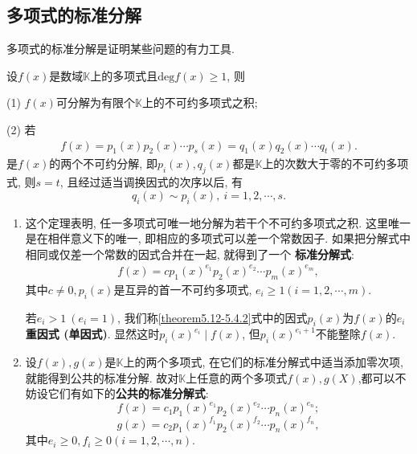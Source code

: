 \documentclass[../../main.tex]{subfiles}%
\begin{document}
\subsection{多项式的标准分解}

多项式的标准分解是证明某些问题的有力工具.

\begin{theorem}[因式分解定理]\label{theorem:因式分解定理}
设\(f(x)\)是数域\(\mathbb{K}\)上的多项式且\(\mathrm{deg }f(x)\geqslant  1\), 则

(1) \(f(x)\)可分解为有限个\(\mathbb{K}\)上的不可约多项式之积;

(2) 若
\begin{align}
f(x)=p_1(x)p_2(x)\cdots p_s(x)=q_1(x)q_2(x)\cdots q_t(x).\label{theorem5.12-5.4.1}
\end{align}
是\(f(x)\)的两个不可约分解, 即\(p_i(x),q_j(x)\)都是\(\mathbb{K}\)上的次数大于零的不可约多项式, 则\(s = t\), 且经过适当调换因式的次序以后, 有
\[
q_i(x)\sim p_i(x),\ i = 1,2,\cdots,s.
\]
\end{theorem}
\begin{note}
\begin{enumerate}
\item 这个定理表明, 任一多项式可唯一地分解为若干个不可约多项式之积. 这里唯一是在相伴意义下的唯一, 即相应的多项式可以差一个常数因子. 如果把分解式中相同或仅差一个常数的因式合并在一起, 就得到了一个 \textbf{标准分解式}:
\begin{align}
f(x)=cp_1(x)^{e_1}p_2(x)^{e_2}\cdots p_m(x)^{e_m}, \label{theorem5.12-5.4.2}
\end{align}
其中\(c\neq 0, p_i(x)\)是互异的首一不可约多项式, \(e_i\geqslant  1(i = 1,2,\cdots,m)\).

若\(e_i>1\ (e_i = 1)\), 我们称\eqref{theorem5.12-5.4.2}式中的因式\(p_i(x)\)为\(f(x)\)的\textbf{\(e_i\)重因式 (单因式)}. 显然这时\(p_i(x)^{e_i}\mid f(x)\), 但\(p_i(x)^{e_i + 1}\)不能整除\(f(x)\).

\item 设\(f(x),g(x)\)是\(\mathbb{K}\)上的两个多项式, 在它们的标准分解式中适当添加零次项,就能得到公共的标准分解. 故对\(\mathbb{K}\)上任意的两个多项式$f(x),g(X)$,都可以不妨设它们有如下的\textbf{公共的标准分解式}:
\[
f(x)=c_1p_1(x)^{e_1}p_2(x)^{e_2}\cdots p_n(x)^{e_n};
\]
\[
g(x)=c_2p_1(x)^{f_1}p_2(x)^{f_2}\cdots p_n(x)^{f_n},
\]
其中\(e_i\geqslant  0, f_i\geqslant  0(i = 1,2,\cdots,n)\).
\end{enumerate}
\end{note}
\end{document}
